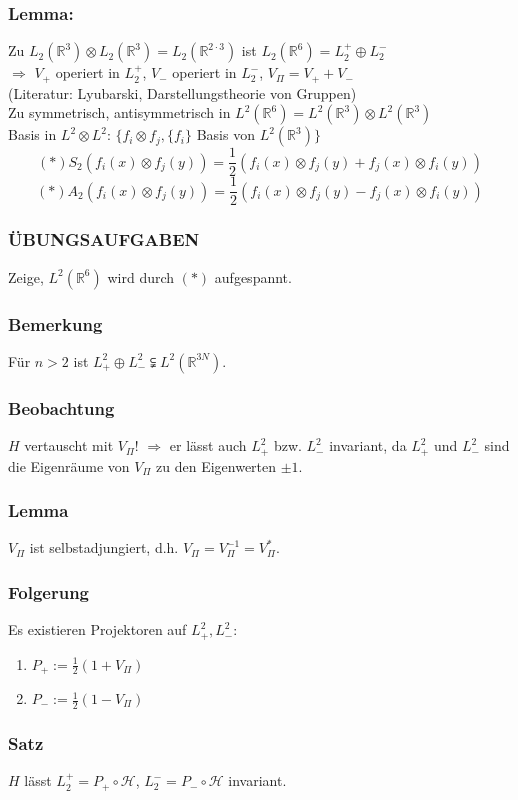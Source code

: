 \documentclass[twoside,a4paper]{scrartcl}
\newcommand{\R}{\mathbb{R}}
\renewcommand{\1}{\mathds{1}}
\newcommand{\Ra}{\Rightarrow}
\renewcommand{\H}{\mathcal{H}}
\renewcommand{\R}{\mathbb{R}}
\begin{document}
\subsubsection*{Lemma:}
Zu $L_2(\R^3)\otimes L_2(\R^3)=L_2(\R^{2\cdot 3})$ ist $L_2(\R^6)=L_2^+\oplus L_2^-$\\
$\Ra$ $V_+$ operiert in $L_2^+$, $V_-$ operiert in $L_2^-$, $V_\Pi=V_++V_-$\\
(Literatur: Lyubarski, Darstellungstheorie von Gruppen)\\
Zu symmetrisch, antisymmetrisch in $L^2(\R^6)=L^2(\R^3)\otimes L^2(\R^3)$\\
Basis in $L^2 \otimes L^2$: $\{f_i \otimes f_j, \{f_i\}$ Basis von $L^2(\R^3)\}$
$$(*) S_2 (f_i(x)\otimes f_j(y))=\frac{1}{2}(f_i(x)\otimes f_j(y)+ f_j(x)\otimes f_i(y))$$
$$(*) A_2 (f_i(x)\otimes f_j(y))=\frac{1}{2}(f_i(x)\otimes f_j(y)- f_j(x)\otimes f_i(y))$$

\subsubsection*{ÜBUNGSAUFGABEN}
Zeige, $L^2(\R^6)$ wird durch $(*)$ aufgespannt.
\subsubsection*{Bemerkung}
Für $n>2$ ist $L_+^2 \oplus L_-^2 \subsetneqq L^2(\R^{3N})$.
\subsubsection*{Beobachtung}
$H$ vertauscht mit $V_\Pi$! 
$\Ra $ er lässt auch $L_+^2$ bzw. $L_-^2$ invariant, da $L_+^2$ und $L_-^2$ sind die Eigenräume von $V_\Pi$ zu den Eigenwerten $\pm 1$.
\subsubsection*{Lemma}
$V_\Pi$ ist selbstadjungiert, d.h. $V_\Pi=V_\Pi^{-1}=V_\Pi^*$.
\subsubsection*{Folgerung}
Es existieren Projektoren auf $L_+^2, L_-^2$:
\begin{enumerate}
\item $P_+:=\frac{1}{2}(1+V_\Pi)$
\item $P_-:=\frac{1}{2}(1-V_\Pi)$
\end{enumerate}
\subsubsection*{Satz}
$H$ lässt $L_2^+=P_+ \circ \H$, $L_2^-=P_- \circ \H$ invariant.
\end{document}
